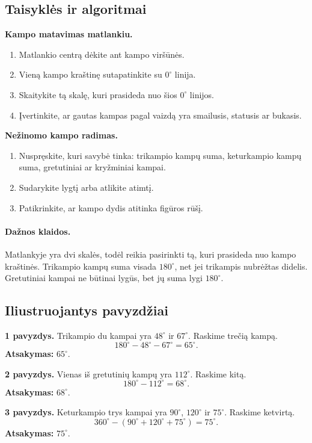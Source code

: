 \subsection{Taisyklės ir algoritmai}
\textbf{Kampo matavimas matlankiu.}
\begin{enumerate}[label=\arabic*.]
\item Matlankio centrą dėkite ant kampo viršūnės.
\item Vieną kampo kraštinę sutapatinkite su \(0^\circ\) linija.
\item Skaitykite tą skalę, kuri prasideda nuo šios \(0^\circ\) linijos.
\item Įvertinkite, ar gautas kampas pagal vaizdą yra smailusis, statusis ar bukasis.
\end{enumerate}

\textbf{Nežinomo kampo radimas.}
\begin{enumerate}[label=\arabic*.]
\item Nuspręskite, kuri savybė tinka: trikampio kampų suma, keturkampio kampų suma, gretutiniai ar kryžminiai kampai.
\item Sudarykite lygtį arba atlikite atimtį.
\item Patikrinkite, ar kampo dydis atitinka figūros rūšį.
\end{enumerate}

\paragraph{Dažnos klaidos.}
Matlankyje yra dvi skalės, todėl reikia pasirinkti tą, kuri prasideda nuo kampo kraštinės. Trikampio kampų suma visada \(180^\circ\), net jei trikampis nubrėžtas didelis. Gretutiniai kampai ne būtinai lygūs, bet jų suma lygi \(180^\circ\).

\subsection{Iliustruojantys pavyzdžiai}
\textbf{1 pavyzdys.} Trikampio du kampai yra \(48^\circ\) ir \(67^\circ\). Raskime trečią kampą.
\[
180^\circ-48^\circ-67^\circ=65^\circ.
\]
\textbf{Atsakymas:} \(65^\circ\).

\textbf{2 pavyzdys.} Vienas iš gretutinių kampų yra \(112^\circ\). Raskime kitą.
\[
180^\circ-112^\circ=68^\circ.
\]
\textbf{Atsakymas:} \(68^\circ\).

\textbf{3 pavyzdys.} Keturkampio trys kampai yra \(90^\circ\), \(120^\circ\) ir \(75^\circ\). Raskime ketvirtą.
\[
360^\circ-(90^\circ+120^\circ+75^\circ)=75^\circ.
\]
\textbf{Atsakymas:} \(75^\circ\).

